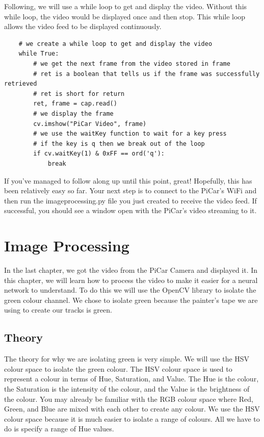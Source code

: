 \documentclass[12pt]{report}
\begin{document}
Following, we will use a while loop to get and display the video. Without this while loop, the video would be displayed once and then stop. This while loop allows the video feed to be displayed continuously.

\begin{verbatim}
    # we create a while loop to get and display the video
    while True:
        # we get the next frame from the video stored in frame
        # ret is a boolean that tells us if the frame was successfully retrieved
        # ret is short for return
        ret, frame = cap.read()
        # we display the frame
        cv.imshow("PiCar Video", frame)
        # we use the waitKey function to wait for a key press
        # if the key is q then we break out of the loop
        if cv.waitKey(1) & 0xFF == ord('q'):
            break
\end{verbatim}

If you’ve managed to follow along up until this point, great! Hopefully, this has been relatively easy so far.
Your next step is to connect to the PiCar's WiFi and then run the imageprocessing.py file you just created to receive the video feed. If successful, you should see a window open with the PiCar's video streaming to it.

\chapter{Image Processing}
In the last chapter, we got the video from the PiCar Camera and displayed it. In this chapter, we will learn how to process the video to make it easier for a neural network to understand. To do this we will use the OpenCV library to isolate the green colour channel. We chose to isolate green because the painter's tape we are using to create our tracks is green. 

\pagebreak

\section{Theory}
The theory for why we are isolating green is very simple. We will use the HSV colour space to isolate the green colour. The HSV colour space is used to represent a colour in terms of Hue, Saturation, and Value. The Hue is the colour, the Saturation is the intensity of the colour, and the Value is the brightness of the colour. You may already be familiar with the RGB colour space where Red, Green, and Blue are mixed with each other to create any colour. We use the HSV colour space because it is much easier to isolate a range of colours. All we have to do is specify a range of Hue values.
\end{document}
